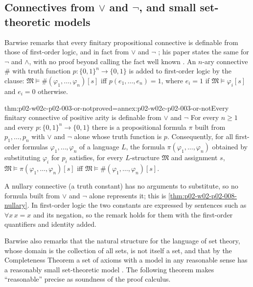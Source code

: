 \subsection{Connectives from \(\lor\) and \(\neg\), and small set-theoretic models}
\label{sec:p02-w02c-p02-003-or-not}

Barwise remarks that every finitary propositional connective is definable
from those of first-order logic, and in fact from \(\lor\) and \(\neg\)
\cite[ch.~A.1, \S5, 5.5, p.~44]{Barwise1977FirstOrder}; his paper states the
same for \(\neg\) and \(\land\), with no proof beyond calling the fact well known
\cite[Part~I, \S9, 9.10, p.~242]{Barwise1974Axioms}.  An \(n\)-ary
connective \(\#\) with truth function \(p:\{0,1\}^{n}\to\{0,1\}\) is added
to first-order logic by the clause: \(\mathfrak M\models\#(\varphi_1,\ldots,
\varphi_n)[s]\) iff \(p(e_1,\ldots,e_n)=1\), where \(e_i=1\) if
\(\mathfrak M\models\varphi_i[s]\) and \(e_i=0\) otherwise.

\begin{hbtheorem}{thm:p02-w02c-p02-003-or-not}{proved=annex:p02-w02c-p02-003-or-not}{Every finitary connective of positive arity is definable from \(\lor\) and \(\neg\)}
For every \(n\geq1\) and every \(p:\{0,1\}^{n}\to\{0,1\}\) there is a
propositional formula \(\pi\) built from \(p_1,\ldots,p_n\) with \(\lor\)
and \(\neg\) alone whose truth function is \(p\).  Consequently, for all
first-order formulas \(\varphi_1,\ldots,\varphi_n\) of a language \(L\),
the formula \(\pi(\varphi_1,\ldots,\varphi_n)\) obtained by substituting
\(\varphi_i\) for \(p_i\) satisfies, for every \(L\)-structure
\(\mathfrak M\) and assignment \(s\),
\(\mathfrak M\models\pi(\varphi_1,\ldots,\varphi_n)[s]\) iff
\(\mathfrak M\models\#(\varphi_1,\ldots,\varphi_n)[s]\).
\end{hbtheorem}

A nullary connective (a truth constant) has no arguments to substitute, so
no formula built from \(\lor\) and \(\neg\) alone represents it; this is
\cref{thm:p02-w02-p02-008-nullary}.  In first-order logic the two constants
are expressed by sentences such as \(\forall x\,x=x\) and its negation, so
the remark holds for them with the first-order quantifiers and identity
added.

Barwise also remarks that the natural structure for the language of set
theory, whose domain is the collection of all sets, is not itself a set,
and that by the Completeness Theorem a set of axioms with a model in any
reasonable sense has a reasonably small set-theoretic model
\cite[ch.~A.1, \S3, pp.~17--18]{Barwise1977FirstOrder}.  The following
theorem makes ``reasonable'' precise as soundness of the proof calculus.

